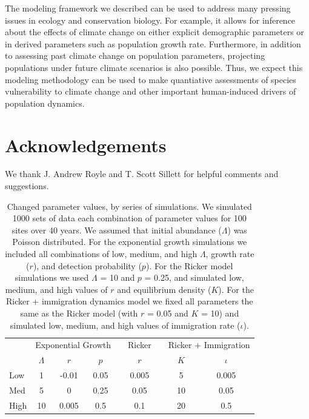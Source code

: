 \documentclass[12pt]{article}
\begin{document}
The modeling framework we described can be used to address many
pressing issues in ecology and conservation biology. For example,
it allows for inference %
about the effects of climate change on either explicit
demographic parameters or in derived parameters such as population
growth rate. Furthermore, %
in addition to assessing past climate change on population parameters,
projecting populations under future climate scenarios is also
possible. Thus, we expect this modeling methodology can be used to
make quantiative assessments of species vulnerability to climate
change and other important human-induced drivers of population dynamics.


\section{Acknowledgements}

We thank J. Andrew Royle and T. Scott Sillett for helpful comments
and suggestions.




\newpage



\begin{table}[t]
  \centering
  \caption{Changed parameter values, by series of simulations.  We
    simulated 1000 sets of data each combination of parameter values
    for 100 sites over 40 years.  We assumed that initial abundance
    ($\Lambda$) was Poisson distributed.  For the exponential growth
    simulations we included all combinations of low, medium, and high
    $\Lambda$, growth rate ($r$), and detection probability ($p$).  For the Ricker
    model simulations we used $\Lambda$ = 10 and $p$ = 0.25, and simulated low,
    medium, and high values of $r$ and equilibrium density ($K$).  For the
    Ricker + immigration dynamics model we fixed all parameters the
    same as the Ricker model (with $r$ = 0.05 and $K$ = 10) and simulated
    low, medium, and high values of immigration rate ($\iota$).}
  \begin{tabular}{lcccccccc}
    \hline
    & \multicolumn{3}{c}{Exponential Growth} && Ricker &&
    \multicolumn{2}{c}{Ricker + Immigration} \\
    \cline{2-4}     \cline{6-6}    \cline{8-9}
                & $\Lambda$ & $r$ & $p$ && $r$  && $K$ & $\iota$  \\
    \hline
    Low	        &1	&-0.01	&0.05	&&0.005	&&5	&0.005  \\
    Med	        &5	&0	&0.25	&&0.05	&&10	&0.05   \\
    High	&10	&0.005	&0.5	&&0.1	&&20	&0.5    \\
    \hline
  \end{tabular}
\end{table}
\end{document}
